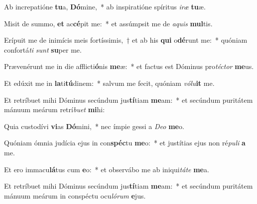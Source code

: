 \item Ab increpatióne \textbf{tu}a, \textbf{Dó}mine,~* ab inspiratióne spíritus \textit{i}\textit{ræ} \textbf{tu}æ.
\item Misit de summo, \textbf{et} ac\textbf{cé}pit me:~* et assúmpsit me de \textit{a}\textit{quis} \textbf{mul}tis.
\item Erípuit me de inimícis meis fortíssimis,~† et ab his \textbf{qui} o\textbf{dé}runt me:~* quóniam confortá\textit{ti} \textit{sunt} \textbf{su}per me.
\item Prævenérunt me in die afflicti\textbf{ó}nis \textbf{me}æ:~* et factus est Dóminus pro\textit{téc}\textit{tor} \textbf{me}us.
\item Et edúxit me in \textbf{la}ti\textbf{tú}dinem:~* salvum me fecit, quóniam \textit{vó}\textit{lu}\textbf{it} me.
\item Et retríbuet mihi Dóminus secúndum jus\textbf{tí}tiam \textbf{me}am:~* et secúndum puritátem mánuum meárum retrí\textit{bu}\textit{et} \textbf{mi}hi:
\item Quia custodívi \textbf{vi}as \textbf{Dó}mini,~* nec ímpie gessi a \textit{De}\textit{o} \textbf{me}o.
\item Quóniam ómnia judícia ejus in con\textbf{spéc}tu \textbf{me}o:~* et justítias ejus non ré\textit{pu}\textit{li} \textbf{a} me.
\item Et ero immacu\textbf{lá}tus cum \textbf{e}o:~* et observábo me ab iniqui\textit{tá}\textit{te} \textbf{me}a.
\item Et retríbuet mihi Dóminus secúndum jus\textbf{tí}tiam \textbf{me}am:~* et secúndum puritátem mánuum meárum in conspéctu ocu\textit{ló}\textit{rum} \textbf{e}jus.
